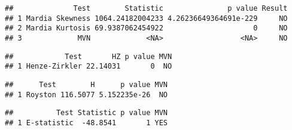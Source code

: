 \documentclass[
]{article}
\newenvironment{Shaded}{\begin{snugshade}}{\end{snugshade}}
\newcommand{\CommentTok}[1]{\textcolor[rgb]{0.56,0.35,0.01}{\textit{#1}}}
\newcommand{\DataTypeTok}[1]{\textcolor[rgb]{0.13,0.29,0.53}{#1}}
\newcommand{\KeywordTok}[1]{\textcolor[rgb]{0.13,0.29,0.53}{\textbf{#1}}}
\newcommand{\NormalTok}[1]{#1}
\newcommand{\OperatorTok}[1]{\textcolor[rgb]{0.81,0.36,0.00}{\textbf{#1}}}
\newcommand{\StringTok}[1]{\textcolor[rgb]{0.31,0.60,0.02}{#1}}
\begin{document}
\begin{verbatim}
##              Test        Statistic               p value Result
## 1 Mardia Skewness 1064.24182004233 4.26236649364691e-229     NO
## 2 Mardia Kurtosis 69.9387062454922                     0     NO
## 3             MVN             <NA>                  <NA>     NO
\end{verbatim}

\begin{Shaded}
\end{Shaded}

\begin{verbatim}
##            Test       HZ p value MVN
## 1 Henze-Zirkler 22.14031       0  NO
\end{verbatim}

\begin{Shaded}
\end{Shaded}

\begin{verbatim}
##      Test        H      p value MVN
## 1 Royston 116.5077 5.152235e-26  NO
\end{verbatim}

\begin{Shaded}
\end{Shaded}

\begin{verbatim}
##          Test Statistic p value MVN
## 1 E-statistic  -48.8541       1 YES
\end{verbatim}

\begin{Shaded}
\end{Shaded}
\end{document}
